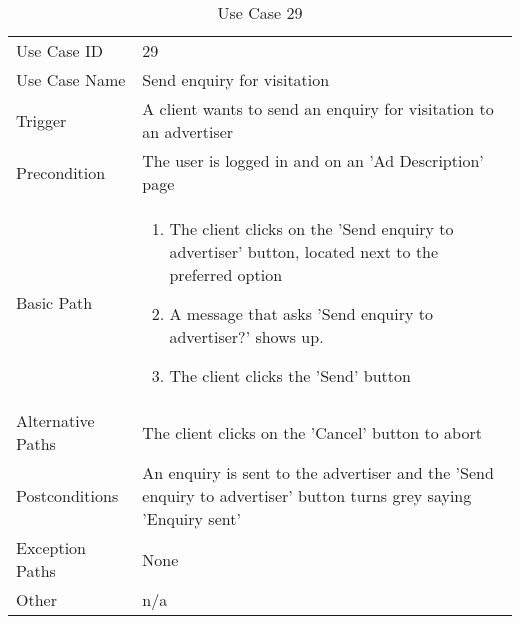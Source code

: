 \begin{table}[H]
\centering
\label{table-use-case-29}
\begin{tabular}{|p{3cm}|p{10cm}}
Use Case ID       & 29                                                           
\\
Use Case Name     & Send enquiry for visitation                                                         
\\
Trigger           & A client wants to send an enquiry for visitation to an
advertiser
\\
Precondition      & The user is logged in and on an 'Ad Description' page                                                
\\
Basic Path        & \begin{enumerate}
\item The client clicks on the 'Send enquiry to advertiser' button, located next
to the preferred option
\item A message that asks 'Send enquiry to advertiser?' shows up.
\item The client clicks the 'Send' button
\end{enumerate} 
     \\
Alternative Paths & The client clicks on the 'Cancel' button to abort                      
\\
Postconditions    & An enquiry is sent to the advertiser and the 'Send enquiry
to advertiser' button turns grey saying 'Enquiry sent'
\\
Exception Paths   & None                          \\
Other             & n/a                                                                                                                                                                                                        
\end{tabular}
\caption{Use Case 29}
\end{table}


